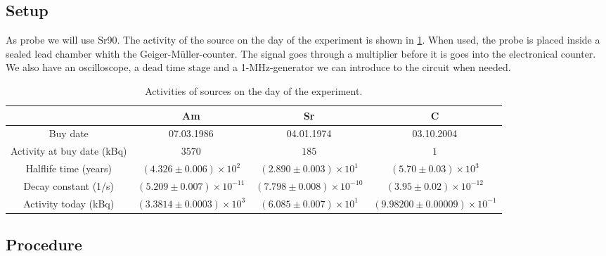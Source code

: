 \subsection{Setup}

As probe we will use Sr90. The activity of the source on the day of the experiment is shown in \cref{tab:Activity}. When used, the probe is placed inside a sealed lead chamber whith the Geiger-Müller-counter. The signal goes through a multiplier before it is goes into the electronical counter. We also have an oscilloscope, a dead time stage and a 1-MHz-generator we can introduce to the circuit when needed.

\begin{table}[H]
        \renewcommand{\arraystretch}{1}
        \centering
        \Large
        \begin{adjustbox}{width=\textwidth}
                \begin{tabular}{|c|c|c|c|}
                        \hline
                        & Am & Sr & C \\
                        \hline
                        Buy date & 07.03.1986 & 04.01.1974 & 03.10.2004 \\
                        \hline
                        Activity at buy date (kBq) & $3570$ & $185$ & $1$ \\
                        \hline
                        Halflife time (years) & $\left(4.326 \pm 0.006\right) \times 10^{2}$ & $\left(2.890 \pm 0.003\right) \times 10^{1}$ & $\left(5.70 \pm 0.03\right) \times 10^{3}$ \\
                        \hline
                        Decay constant (1/s) & $\left(5.209 \pm 0.007\right) \times 10^{-11}$ & $\left(7.798 \pm 0.008\right) \times 10^{-10}$ & $\left(3.95 \pm 0.02\right) \times 10^{-12}$ \\
                        \hline
                        Activity today (kBq) & $\left(3.3814 \pm 0.0003\right) \times 10^{3}$ & $\left(6.085 \pm 0.007\right) \times 10^{1}$ & $\left(9.98200 \pm 0.00009\right) \times 10^{-1}$ \\
                        \hline
                \end{tabular}
        \end{adjustbox}
        \caption{Activities of sources on the day of the experiment.}
        \label{tab:Activity}
\end{table}   

\subsection{Procedure}

